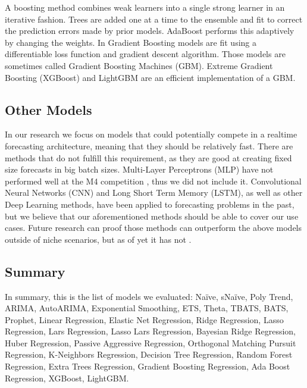 A boosting method combines weak learners into a single strong learner in an iterative fashion. Trees are added one at a time to the ensemble and fit to correct the prediction errors made by prior models. AdaBoost performs this adaptively by changing the weights. In Gradient Boosting models are fit using a differentiable loss function and gradient descent algorithm. Those models are sometimes called Gradient Boosting Machines (GBM). Extreme Gradient Boosting (XGBoost) and LightGBM are an efficient implementation of a GBM.

\subsection{Other Models}

In our research we focus on models that could potentially compete in a realtime forecasting architecture, meaning that they should be relatively fast. There are methods that do not fulfill this requirement, as they are good at creating fixed size forecasts in big batch sizes. Multi-Layer Perceptrons (MLP) have not performed well at the M4 competition \cite{M4}, thus we did not include it. Convolutional Neural Networks (CNN) and Long Short Term Memory (LSTM), as well as other Deep Learning methods, have been applied to forecasting problems in the past, but we believe that our aforementioned methods should be able to cover our use cases. Future research can proof those methods can outperform the above models outside of niche scenarios, but as of yet it has not \cite{M4} \cite{M5}.

\subsection{Summary}

In summary, this is the list of models we evaluated: Na\"ive, sNa\"ive, Poly Trend, ARIMA, AutoARIMA, Exponential Smoothing, ETS, Theta, TBATS, BATS, Prophet, Linear Regression, Elastic Net Regression, Ridge Regression, Lasso Regression, Lars Regression, Lasso Lars Regression, Bayesian Ridge Regression, Huber Regression, Passive Aggressive Regression, Orthogonal Matching Pursuit Regression, K-Neighbors Regression, Decision Tree Regression, Random Forest Regression, Extra Trees Regression, Gradient Boosting Regression, Ada Boost Regression, XGBoost, LightGBM.

